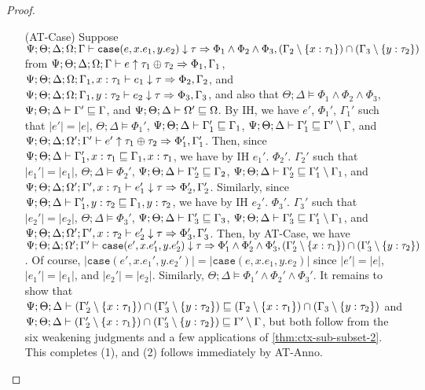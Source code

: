 \begin{proof}
\begin{itemize}
  \item[(AT-Case)] Suppose $\Psi ; \Theta ; \Delta ; \Omega ; \Gamma \vdash \texttt{case}(e,x.e_1,y.e_2) \downarrow \tau \Rightarrow \Phi_1 \wedge \Phi_2 \wedge \Phi_3, (\Gamma_2 \setminus \{x : \tau_1\}) \cap (\Gamma_3 \setminus \{y : \tau_2\})$
  from $\Psi ; \Theta ; \Delta ; \Omega ; \Gamma \vdash e \uparrow \tau_1 \oplus \tau_2 \Rightarrow \Phi_1, \Gamma_1$,
  $\Psi ; \Theta ; \Delta ; \Omega ; \Gamma_1, x: \tau_1 \vdash e_1 \downarrow \tau \Rightarrow \Phi_2,\Gamma_2$, and
  $\Psi ; \Theta ; \Delta ; \Omega ; \Gamma_1, y: \tau_2 \vdash e_2 \downarrow \tau \Rightarrow \Phi_3,\Gamma_3$, and also that
  $\Theta ; \Delta \vDash \Phi_1 \wedge \Phi_2 \wedge \Phi_3$,
  $\Psi ; \Theta ; \Delta \vdash \Gamma' \sqsubseteq \Gamma$, and
  $\Psi ; \Theta ; \Delta \vdash \Omega' \sqsubseteq \Omega$.
  By IH, we have $e'$, $\Phi_1'$, $\Gamma_1'$ such that
  $|e'| = |e|$,
  $\Theta ; \Delta \vDash \Phi_1'$,
  $\Psi ; \Theta ; \Delta \vdash \Gamma_1' \sqsubseteq \Gamma_1$,
  $\Psi ; \Theta ; \Delta \vdash \Gamma_1' \sqsubseteq \Gamma' \setminus \Gamma$, and
  $\Psi ; \Theta ; \Delta ; \Omega' ; \Gamma' \vdash e' \uparrow \tau_1 \oplus \tau_2 \Rightarrow \Phi_1',\Gamma_1'$.
  Then, since $\Psi ; \Theta ; \Delta \vdash \Gamma_1', x : \tau_1 \sqsubseteq \Gamma_1, x : \tau_1$,
  we have by IH $e_1'$. $\Phi_2'$. $\Gamma_2'$ such that
  $|e_1'| = |e_1|$,
  $\Theta  ; \Delta \vDash \Phi_2'$,
  $\Psi ; \Theta ; \Delta \vdash \Gamma_2' \sqsubseteq \Gamma_2$,
  $\Psi ; \Theta ; \Delta \vdash \Gamma_2' \sqsubseteq \Gamma_1' \setminus \Gamma_1$, and
  $\Psi ; \Theta ; \Delta ; \Omega' ; \Gamma', x : \tau_1 \vdash e_1' \downarrow \tau \Rightarrow \Phi_2',\Gamma_2'$.
  Similarly, since $\Psi ; \Theta ; \Delta \vdash \Gamma_1', y : \tau_2 \sqsubseteq \Gamma_1, y : \tau_2$,
  we have by IH $e_2'$. $\Phi_3'$. $\Gamma_3'$ such that
  $|e_2'| = |e_2|$,
  $\Theta  ; \Delta \vDash \Phi_3'$,
  $\Psi ; \Theta ; \Delta \vdash \Gamma_3' \sqsubseteq \Gamma_3$,
  $\Psi ; \Theta ; \Delta \vdash \Gamma_3' \sqsubseteq \Gamma_1' \setminus \Gamma_1$, and
  $\Psi ; \Theta ; \Delta ; \Omega' ; \Gamma', x : \tau_2 \vdash e_2' \downarrow \tau \Rightarrow \Phi_3',\Gamma_3'$.
  Then, by AT-Case, we have
  $\Psi ; \Theta ; \Delta ; \Omega' ; \Gamma' \vdash \texttt{case}(e',x.e_1',y.e_2') \downarrow \tau \Rightarrow \Phi_1' \wedge \Phi_2' \wedge \Phi_3', (\Gamma_2' \setminus \{x : \tau_1\}) \cap (\Gamma_3' \setminus \{y : \tau_2\})$.
  Of course, $|\texttt{case}(e',x.e_1',y.e_2')| = |\texttt{case}(e,x.e_1,y.e_2)|$
  since $|e'| = |e|$, $|e_1'| = |e_1|$, and $|e_2'| = |e_2|$.
  Similarly,
  $\Theta ; \Delta \vDash \Phi_1' \wedge \Phi_2' \wedge \Phi_3'$.
  It remains to show that 
  $\Psi ; \Theta ; \Delta \vdash (\Gamma_2' \setminus \{x : \tau_1\}) \cap (\Gamma_3' \setminus \{y : \tau_2\}) \sqsubseteq (\Gamma_2 \setminus \{x : \tau_1\}) \cap (\Gamma_3 \setminus \{y : \tau_2\})$
  and
  $\Psi ; \Theta ; \Delta \vdash (\Gamma_2' \setminus \{x : \tau_1\}) \cap (\Gamma_3' \setminus \{y : \tau_2\}) \sqsubseteq \Gamma' \setminus \Gamma$,
  but both follow from the six weakening judgments and a few applications of \autoref{thm:ctx-sub-subset-2}.
  This completes (1), and (2) follows immediately by AT-Anno.
  

\end{itemize}
\end{proof}
